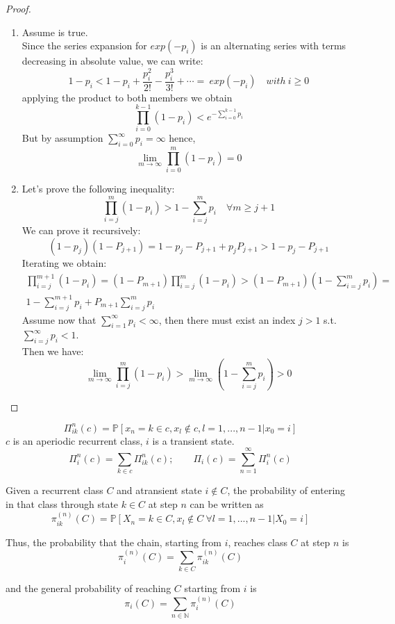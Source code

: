 	\begin{proof}
		\begin{enumerate}
			\item Assume  is true. \\
				Since the series expansion for $exp(-p_i)$ is an alternating series with terms decreasing in absolute value, we can write:
				\begin{equation}
					1-p_i < 1-p_i + \frac{p_i^2}{2!} - \frac{p_i^3}{3!} + \cdots = ~exp(-p_i) \quad with ~i\ge 0
				\end{equation}
				applying the product to both members we obtain
				\begin{equation}
					\prod_{i=0}^{k-1} (1-p_i) < e^{-\sum_{i=0}^{k-1}p_i}
				\end{equation}
				But by assumption $\sum_{i=0}^\infty p_i = \infty$ hence,
				$$ \lim_{m \to \infty} \prod_{i=0}^{m}(1-p_i) = 0 $$

			\item Let's prove the following inequality:
			$$ \prod_{i=j}^m(1-p_i) > 1-\sum_{i=j}^m p_i \quad \forall m \ge j+1$$
			We can prove it recursively:
			$$(1-p_j)(1-P_{j+1}) = 1-p_j - P_{j+1} + p_jP_{j+1} > 1-p_j - P_{j+1}$$
			Iterating we obtain:
			\begin{eqnarray*}
				\prod_{i=j}^{m+1}(1-p_i) = (1-P_{m+1})\prod_{i=j}^m(1-p_i) > (1-P_{m+1})(1-\sum_{i=j}^m p_i) = \\
				1- \sum_{i=j}^{m+1} p_i + P_{m+1}\sum_{i=j}^m p_i
			\end{eqnarray*}
			Assume now that $\sum_{i=1}^\infty p_i < \infty$, then there must exist an index $j>1$ s.t. $\sum_{i=j}^\infty p_i < 1$. \\
			Then we have:
			$$ \lim_{m \to \infty} \prod_{i=j}^m (1-p_i) > \lim_{m \to \infty} (1-\sum_{i=j}^m p_i) > 0 $$
		\end{enumerate}
	\end{proof}

	\begin{definition}[lesson 22/03/17]
		$$\Pi_{ik}^n(c) = \mathbb{P}[x_n = k \in c, x_l \notin c, l=1, ... , n-1 | x_0 =i]$$
		$c$ is an aperiodic recurrent class, $i$ is a transient state.
		$$\Pi_i^n(c) = \sum_{k \in c} \Pi_{ik}^n(c); \qquad \Pi_i(c) = \sum_{n=1}^\infty \Pi_i^n(c)$$
	\end{definition}


	\begin{definition} \label{def:falling_probability}
		Given a recurrent class $C$ and atransient state $i \notin C$, the probability of entering in that class through state $k \in C$ at step $n$ can be written as
		$$ \pi_{ik}^{(n)}(C) = \mathbb{P}[X_n = k \in C, x_l \notin C ~ \forall l=1, ..., n-1 | X_0 = i] $$

		Thus, the probability that the chain, starting from $i$, reaches class $C$ at step $n$ is
		$$ \pi_{i}^{(n)}(C) = \sum_{k \in C} \pi_{ik}^{(n)}(C) $$

		and the general probability of reaching $C$ starting from $i$ is
		$$ \pi_i(C) = \sum_{n \in \mathbb{N}} \pi_i^{(n)}(C) $$
	\end{definition}

